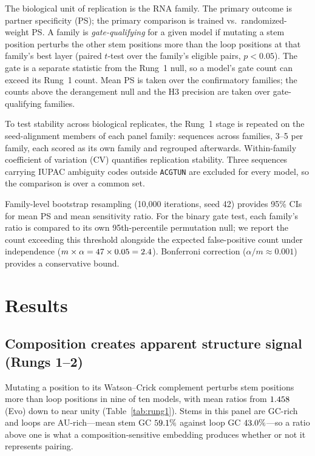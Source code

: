 \documentclass[11pt]{article}
\begin{document}
The biological unit of replication is the RNA family. The primary outcome is
partner specificity (PS); the primary comparison is trained vs.\
randomized-weight PS. A family is \emph{gate-qualifying} for a given model
if mutating a stem position perturbs the other stem positions more than the
loop positions at that family's best layer (paired $t$-test over the family's
eligible pairs, $p < 0.05$). The gate is a separate statistic from the Rung~1
null, so a model's gate count can exceed its Rung~1 count. Mean PS is taken
over the confirmatory families; the counts above the derangement null and the
H3 precision are taken over gate-qualifying families.

To test stability across biological replicates, the Rung~1 stage is repeated on
the seed-alignment members of each panel family: \multiseqN{} sequences across
\multiseqFamilies{} families, 3--5 per family, each scored as its own family and
regrouped afterwards. Within-family coefficient of variation (CV) quantifies
replication stability. Three sequences carrying IUPAC ambiguity codes outside
\texttt{ACGTUN} are excluded for every model, so the comparison is over a common
set.

Family-level bootstrap resampling (10{,}000 iterations, seed 42)
provides 95\% CIs for mean PS and mean sensitivity ratio. For the binary
gate test, each family's ratio is compared to its own 95th-percentile
permutation null; we report the count exceeding this threshold alongside
the expected false-positive count under independence
($m \times \alpha = 47{} \times 0.05 = 2.4{}$).
Bonferroni correction
($\alpha / m \approx 0.001$) provides a conservative bound.


\section{Results}

\subsection{Composition creates apparent structure signal (Rungs 1--2)}
\label{sec:composition-results}

Mutating a position to its Watson--Crick complement perturbs stem positions
more than loop positions in nine of ten models, with mean ratios from
$1.458{}$ (Evo) down to near unity (Table~\ref{tab:rung1}). Stems in
this panel are GC-rich and loops are AU-rich---mean stem GC $59.1{}\%$
against loop GC $43.0{}\%$---so a ratio above one is what a
composition-sensitive embedding produces whether or not it represents pairing.
\end{document}
